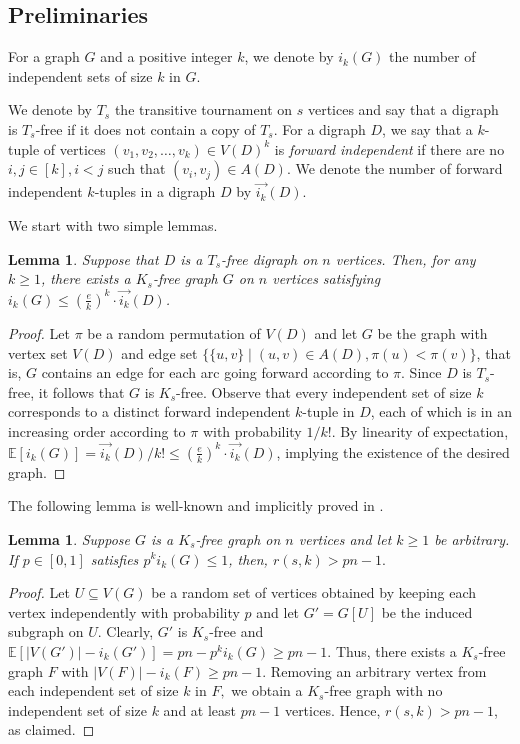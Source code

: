 \documentclass{article}
\theoremstyle{plain}
\newtheorem{lemma}[theorem]{Lemma}
\theoremstyle{definition}
\DeclareMathOperator{\E}{\mathbb{E}}
\renewcommand{\E}{\mathbb{E}}
\newcommand{\fwi}[1]{\overrightarrow{i_{#1}}}
\begin{document}
\subsection{Preliminaries} \label{subsec:prelims}
For a graph $G$ and a positive integer $k$, we denote by $i_k(G)$ the number of independent sets of size $k$ in $G$. 

We denote by $T_s$ the transitive tournament on $s$ vertices and say that a digraph is $T_s$-free if it does not contain a copy of $T_s$. For a digraph $D$, we say that a $k$-tuple of vertices $(v_1, v_2, \dots, v_k) \in V(D)^k$ is \emph{forward independent} if there are no $i, j \in [k], i < j$ such that $(v_i, v_j) \in A(D)$. We denote the number of forward independent $k$-tuples in a digraph $D$ by $\fwi{k}(D)$.

We start with two simple lemmas.
\begin{lemma} \label{lem:Ts-free-Ks-free}
    Suppose that $D$ is a $T_s$-free digraph on $n$ vertices. Then, for any $k \ge 1$, there exists a $K_s$-free graph $G$ on $n$ vertices satisfying $i_k(G) \le \left(\frac{e}{k} \right)^k \cdot \fwi{k}(D)$.
\end{lemma}
\begin{proof}
    Let $\pi$ be a random permutation of $V(D)$ and let $G$ be the graph with vertex set $V(D)$ and edge set $\{ \{u, v\} \mid (u, v) \in A(D), \pi(u) < \pi(v) \}$, that is, $G$ contains an edge for each arc going forward according to $\pi$. Since $D$ is $T_s$-free, it follows that $G$ is $K_s$-free. Observe that every independent set of size $k$ corresponds to a distinct forward independent $k$-tuple in $D$, each of which is in an increasing order according to $\pi$ with probability $1/k!$. By linearity of expectation, $\E[i_k(G)] = \fwi{k}(D) / k! \le \left( \frac{e}{k}\right)^k \cdot \fwi{k}(D)$, implying the existence of the desired graph.
\end{proof}

The following lemma is well-known and implicitly proved in \cite{mubayi-verstraete}.
\begin{lemma} \label{lem:sampling-Ks-free}
    Suppose $G$ is a $K_s$-free graph on $n$ vertices and let $k \ge 1$ be arbitrary. If $p \in [0, 1]$ satisfies $p^{k} i_k(G) \le 1$, then, $r(s, k) > pn - 1.$
\end{lemma}
\begin{proof}
    Let $U \subseteq V(G)$ be a random set of vertices obtained by keeping each vertex independently with probability $p$ and let $G' = G[U]$ be the induced subgraph on $U$. Clearly, $G'$ is $K_s$-free and $\E[ |V(G')| - i_k(G')] = p n - p^k i_k(G) \ge pn - 1$. Thus, there exists a $K_s$-free graph $F$ with $|V(F)| - i_k(F) \ge pn - 1$. Removing an arbitrary vertex from each independent set of size $k$ in $F,$ we obtain a $K_s$-free graph with no independent set of size $k$ and at least $pn - 1$ vertices. Hence, $r(s, k) > pn - 1$, as claimed.
\end{proof}
\end{document}
